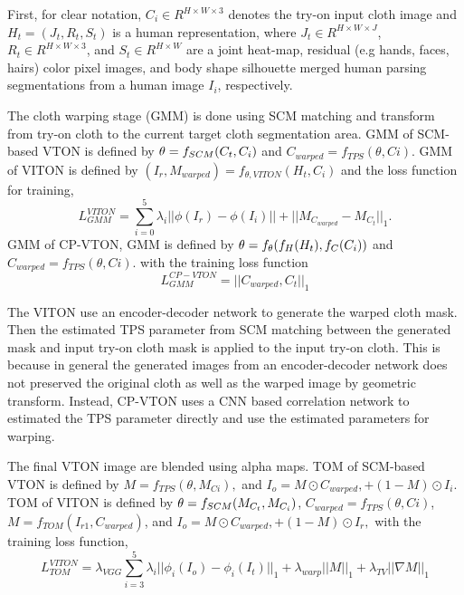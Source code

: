 First, for clear notation, $C_i \in R^{H \times W \times3} $ denotes the try-on input cloth image 
and $ H_t = (J_t, R_t, S_t)$ is a human representation, 
where $ J_t \in R^{H \times W \times J}$, $R_t \in R^{H \times W \times 3}$, and $ S_t \in R^{H \times W}$ are a joint heat-map, residual (e.g hands, faces, hairs) color pixel images, and body shape silhouette merged human parsing segmentations from a human image $I_i$, respectively.    

The cloth warping stage (GMM) is done using SCM matching and transform from try-on cloth to the current target cloth segmentation area. 
GMM of SCM-based VTON is defined by  
$
   \bold{\theta} = f_{SCM} (C_t, C_i)
$
and
$
   C_{warped} = f_{TPS}(\theta, Ci)
$.    
GMM of VITON is defined by 
$
   (I_{r}, M_{warped}) = f_{\theta, VITON} (H_t, C_i) 
$
and the loss function for training, 
\begin{equation}
   L_{GMM}^{VITON} =   \sum_{i=0}^{5} \lambda_i || \phi (I_r) - \phi (I_i)||  + 
   ||M_{C_{warped}} -  M_{C_t}||_1 .
\end{equation}
GMM of CP-VTON, GMM is defined by 
$  
   \bold{\theta} = f_{\theta} ( f_H (H_t), f_C(C_i) )
$
and
$
   C_{warped} = f_{TPS}(\theta, Ci).
$    
with the training loss function
\begin{equation}
   L_{GMM}^{CP-VTON} =  ||C_{warped}, C_t||_1
\end{equation}

The VITON use an encoder-decoder network to generate the warped cloth mask. Then the estimated TPS parameter from SCM matching between the generated mask and input try-on cloth mask is applied to the input try-on cloth. This is because in general the generated images from an encoder-decoder network does not preserved the original cloth as well as the warped image by geometric transform. Instead, CP-VTON uses a CNN based correlation network to estimated the TPS parameter directly and use the estimated parameters for warping.   



The final VTON image are blended using alpha maps.
TOM  of SCM-based VTON  is defined by 
$
   M = f_{TPS}(\theta, M_{Ci}),
$    
and 
$
   I_o = M \odot C_{warped}, + (1-M) \odot I_i 
$.
TOM of VITON is defined by 
$
   \bold{\theta} = f_{SCM} (M_{C_t}, M_{C_i})
$,
$
   C_{warped} = f_{TPS}(\theta, Ci)
$,    
$
 M = f_{TOM} ( I_{r1}, C_{warped} ) 
$, 
and 
$
   I_o = M \odot C_{warped}, + (1-M) \odot I_{r},
$
with the training loss function, 
\begin{equation}
   L_{TOM}^{VITON} = \lambda_{VGG} \sum_{i=3}^{5} \lambda_i || \phi_i(I_o) - \phi_i(I_t)||_{1}  + 
             \lambda_{warp}  || M ||_{1}  + 
             \lambda_{TV} || \nabla M||_{1}      
\end{equation}


